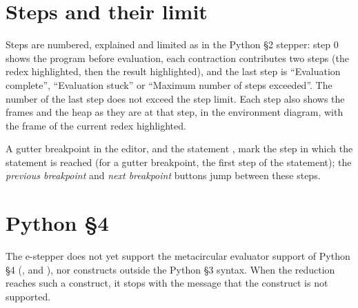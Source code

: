 \section*{Steps and their limit}

Steps are numbered, explained and limited as in the Python \S 2 stepper:
step 0 shows the program before evaluation, each contraction contributes two
steps (the redex highlighted, then the result highlighted), and the last step
is ``Evaluation complete'', ``Evaluation stuck'' or ``Maximum number of steps
exceeded''. The number of the last step does not exceed the step limit.
Each step also shows the frames and the heap as they are at that step, in the
environment diagram, with the frame of the current redex highlighted.

A gutter breakpoint in the editor, and the statement ,
mark the step in which the statement is reached (for a gutter breakpoint, the
first step of the statement); the \emph{previous breakpoint} and \emph{next
breakpoint} buttons jump between these steps.

\section*{Python \S 4}

The e-stepper does not yet support the metacircular evaluator support of
Python \S 4 (,  and
), nor constructs outside the Python \S 3
syntax. When the reduction reaches such a construct, it stops with the
message that the construct is not supported.
